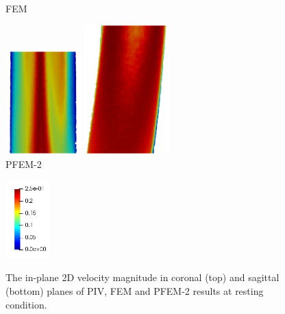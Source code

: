 \begin{figure}
\begin{minipage}[c][10cm][c]{0.25\textwidth}
\\FEM
\end{minipage}
\begin{minipage}[c][10cm][c]{0.25\textwidth}
\centering
\vspace*{\fill}
\includegraphics[height=4cm]{imgs/vena_cava/PFEM_coronal_exercise.png}
\includegraphics[height=5cm]{imgs/vena_cava/PFEM_sagittal_exercise.png}
\\PFEM-2
\end{minipage}
\begin{minipage}[c][10cm][t]{0.1\textwidth}
\vspace*{\fill}
\centering
\includegraphics[height=3cm]{imgs/vena_cava/colormap_exercise.png}
\\
\end{minipage}
\caption{The in-plane 2D velocity magnitude in coronal (top) and sagittal (bottom) planes of PIV, FEM and PFEM-2 results at resting condition.}
\label{fig:exercise}
\end{figure}

